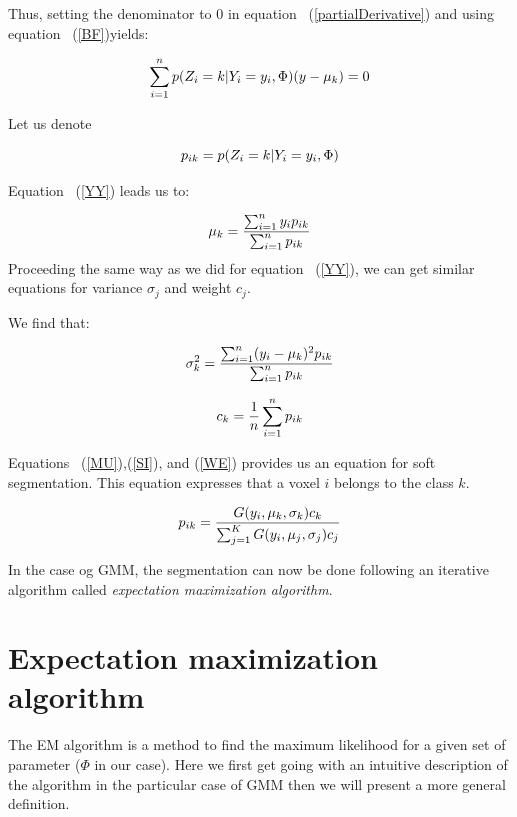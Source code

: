 Thus, setting the denominator to 0 in equation ~(\ref{partialDerivative}) and using equation ~(\ref{BF})yields:
 
  \begin{equation}\label{YY}
  \sum_{i=1}^n p(Z_i=k|Y_i=y_i,\Phi)(y-\mu_k)=0\\
  \end{equation}

Let us denote

  \begin{equation}%
  p_{ik}=p(Z_i=k|Y_i=y_i,\Phi)\\
  \end{equation}

Equation ~(\ref{YY}) leads us to:
 
  \begin{equation}\label{MU}
  \mu_k = \frac{\sum_{i=1}^n y_ip_{ik}}{\sum_{i=1}^n p_{ik}}\\
  \end{equation}
Proceeding the same way as we did for equation ~(\ref{YY}), we can get similar equations for variance $\sigma_j$ and weight $c_j$. 

We find that:

  \begin{equation}\label{SI}
  \sigma_k^2 = \frac{\sum_{i=1}^n (y_i-\mu_k)^2p_{ik}}{\sum_{i=1}^n p_{ik}}\\
  \end{equation}
  
  \begin{equation}\label{WE}
  c_k = \frac{1}{n}\sum_{i=1}^n p_{ik}\\
  \end{equation}

\par
Equations ~(\ref{MU}),(\ref{SI}), and (\ref{WE}) provides us an equation for soft segmentation. This equation expresses that a voxel $i$ belongs to the class $k$.
  
  \begin{equation}\label{SS}
  p_{ik}= \frac{G(y_i,\mu_k,\sigma_k)c_k}{\sum_{j=1}^K G(y_i,\mu_j,\sigma_j)c_j}\\
  \end{equation}

In the case og GMM, the segmentation can now be done following an iterative algorithm called \textit{expectation maximization algorithm}.
%
\section{Expectation maximization algorithm}
The EM algorithm is a method to find the maximum likelihood for a given set of parameter ($\Phi$ in our case). Here we first get going with an 
intuitive description of the algorithm in the particular case of GMM then we will present a more general definition.
%
